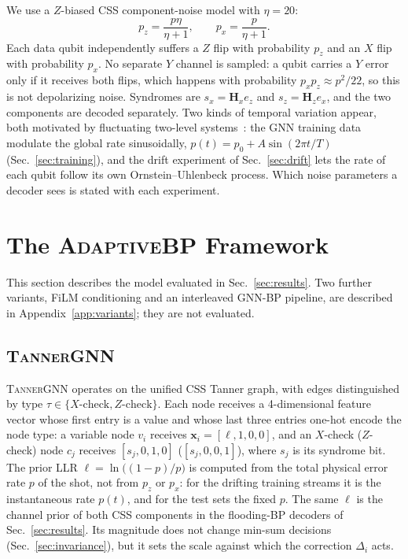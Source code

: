 \documentclass[a4paper,twocolumn,11pt,nopdfoutputerror]{quantumarticle}
\newcommand{\Hmat}{\mathbf{H}}
\newcommand{\bvec}[1]{\mathbf{#1}}
\begin{document}
We use a $Z$-biased CSS component-noise model with $\eta = 20$:
\begin{equation}
p_z = \frac{p\eta}{\eta+1}, \qquad p_x = \frac{p}{\eta+1}.
\label{eq:bias}
\end{equation}
Each data qubit independently suffers a $Z$ flip with probability $p_z$
and an $X$ flip with probability $p_x$. No separate $Y$ channel is
sampled: a qubit carries a $Y$ error only if it receives both flips,
which happens with probability $p_xp_z\approx p^2/22$, so this is not
depolarizing noise. Syndromes are $s_x=\Hmat_x e_z$ and
$s_z=\Hmat_z e_x$, and the two components are decoded separately.
Two kinds of temporal variation appear, both motivated by fluctuating
two-level systems~\cite{Klimov2018,Carroll2022}: the GNN training data
modulate the global rate sinusoidally, $p(t) = p_0 + A\sin(2\pi t/T)$
(Sec.~\ref{sec:training}), and the drift experiment of
Sec.~\ref{sec:drift} lets the rate of each qubit follow its own
Ornstein--Uhlenbeck process. Which noise parameters a decoder sees is
stated with each experiment.

\section{The \textsc{AdaptiveBP} Framework}\label{sec:methods}

This section describes the model evaluated in Sec.~\ref{sec:results}. Two
further variants, FiLM conditioning and an interleaved GNN-BP pipeline,
are described in Appendix~\ref{app:variants}; they are not evaluated.

\subsection{\textsc{TannerGNN}}\label{sec:tannergnn}

\textsc{TannerGNN} operates on the unified CSS Tanner graph, with
edges distinguished by type $\tau \in \{X\text{-check},Z\text{-check}\}$.
Each node receives a 4-dimensional feature vector whose first entry is
a value and whose last three entries one-hot encode the node type: a
variable node $v_i$ receives $\bvec{x}_i=[\ell,1,0,0]$, and an $X$-check
($Z$-check) node $c_j$ receives $[s_j,0,1,0]$ ($[s_j,0,0,1]$), where
$s_j$ is its syndrome bit. The prior LLR $\ell=\ln\bigl((1-p)/p\bigr)$ is
computed from the total physical error rate $p$ of the shot, not from
$p_z$ or $p_x$: for the drifting training streams it is the
instantaneous rate $p(t)$, and for the test sets the fixed $p$. The same
$\ell$ is the channel prior of both CSS components in the flooding-BP
decoders of Sec.~\ref{sec:results}. Its magnitude does not change
min-sum decisions (Sec.~\ref{sec:invariance}), but it sets the scale
against which the correction $\Delta_i$ acts.
\end{document}
